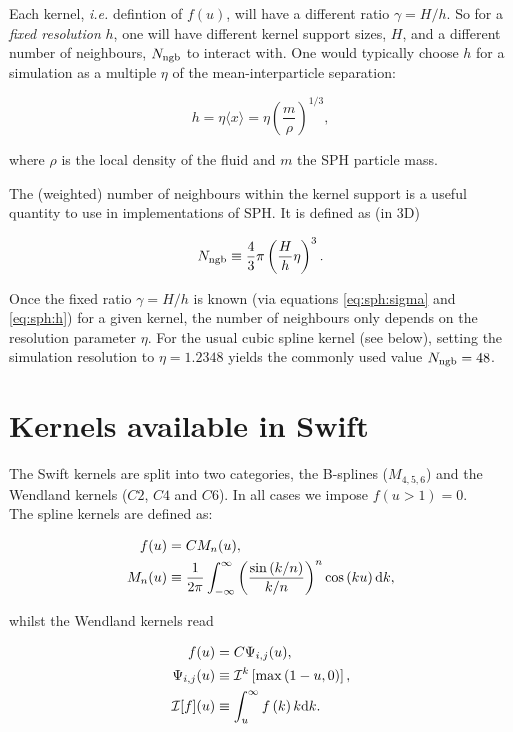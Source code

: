 \documentclass[a4paper]{mnras}
\newcommand{\swift}{{\sc Swift}\xspace}
\begin{document}
Each kernel, {\it i.e.} defintion of $f(u)$, will have a different
ratio $\gamma = H/h$. So for a \emph{fixed resolution} $h$, one will
have different kernel support sizes, $H$, and a different number of
neighbours, $N_{\rm ngb}$ to interact with. One would typically choose
$h$ for a simulation as a multiple $\eta$ of the mean-interparticle
separation:

\begin{equation}
  h = \eta \langle x \rangle = \eta \left(\frac{m}{\rho}\right)^{1/3},
\end{equation}

where $\rho$ is the local density of the fluid and $m$ the SPH
particle mass. 

The (weighted) number of neighbours within the kernel support is a
useful quantity to use in implementations of SPH. It is defined as (in
3D)

\begin{equation}
  N_{\rm ngb} \equiv \frac{4}{3}\pi \left(\frac{H}{h}\eta\right)^3.
\end{equation}

Once the fixed ratio $\gamma= H/h$ is known (via equations
\ref{eq:sph:sigma} and \ref{eq:sph:h}) for a given kernel, the number
of neighbours only depends on the resolution parameter $\eta$.  For
the usual cubic spline kernel (see below), setting the simulation
resolution to $\eta=1.2348$ yields the commonly used value $N_{\rm
  ngb} = 48$.

\section{Kernels available in \swift}

The \swift kernels are split into two categories, the B-splines
($M_{4,5,6}$) and the Wendland kernels ($C2$, $C4$ and $C6$). In all
cases we impose $f(u>1) = 0$.\\

The spline kernels are defined as:

\begin{align}
  f(u) &= C M_n(u), \\
  M_n(u) &\equiv \frac{1}{2\pi}
  \int_{-\infty}^{\infty}
  \left(\frac{\sin\left(k/n\right)}{k/n}\right)^n\cos\left(ku\right){\rm
  d}k,
\end{align}

whilst the Wendland kernels read

\begin{align}
  f(u) &= C \Psi_{i,j}(u), \\
  \Psi_{i,j}(u) &\equiv \mathcal{I}^k\left[\max\left(1-u,0\right)\right],\\
  \mathcal{I}[f](u) &\equiv \int_u^\infty f\left(k\right)k{\rm d}k.
\end{align}
\end{document}
